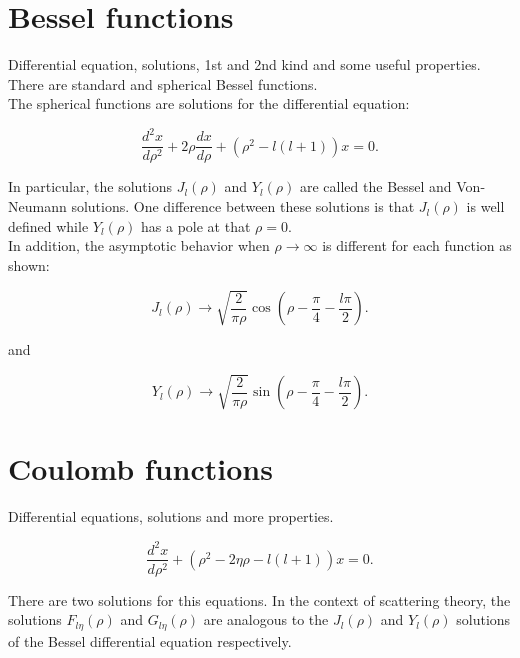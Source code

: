 \documentclass[openany]{book}
\begin{document}
\section{Bessel functions} \label{sec:bessel}

Differential equation, solutions, 1st and 2nd kind and some useful properties. There are standard and spherical Bessel functions. \\

The spherical functions are solutions for the differential equation:

\begin{equation} \label{eq:special_bessel_diffEquation}
	\frac{d^2x}{d\rho^2} + 2\rho \frac{dx}{d\rho} + (\rho^2 - l(l+1))x= 0.
\end{equation}

In particular, the solutions $J_l(\rho)$ and $Y_l(\rho)$ are called the Bessel and Von-Neumann solutions. One difference between these solutions is that $J_l(\rho)$ is well defined while $Y_l(\rho)$  has a pole at that $\rho = 0$.   \\

In addition, the asymptotic behavior when $\rho \rightarrow \infty$ is different for each function as shown:

\begin{equation} \label{eq:special_bessel_J}
	J_l(\rho) \rightarrow \sqrt{ \frac{2}{\pi\rho}}\cos{\left(\rho - \frac{\pi}{4} - \frac{l\pi}{2}\right)}.
\end{equation}

and


\begin{equation} \label{eq:special_bessel_Y}
	Y_l(\rho) \rightarrow \sqrt{\frac{2}{\pi\rho}}\sin{\left(\rho - \frac{\pi}{4} - \frac{l\pi}{2}\right)}.
\end{equation}


\section{Coulomb functions} \label{sec:coulomb}

Differential equations, solutions and more properties.

\begin{equation}  \label{eq:special_coulomb_diffEquation}
	\frac{d^2x}{d\rho^2}+ (\rho^2 - 2\eta \rho  - l(l+1) )x= 0.
\end{equation}

There are two solutions for this equations. In the context of scattering theory, the solutions $F_{l\eta}(\rho)$ and $G_{l\eta}(\rho)$ are analogous to the  $J_l(\rho)$ and $Y_l(\rho)$ solutions of the Bessel differential equation respectively.  \\
\end{document}
